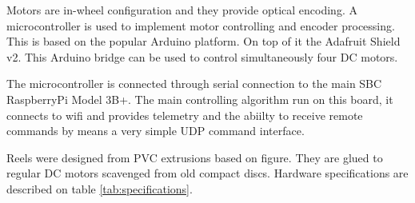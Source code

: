 \documentclass[journal]{IEEEtran}
\begin{document}
Motors are in-wheel configuration and they provide optical encoding.  A microcontroller is used to implement motor controlling and encoder processing.  This is based on the popular Arduino platform.  On top of it the Adafruit Shield v2.  This Arduino bridge can be used to control simultaneously four DC motors.

The microcontroller is connected through serial connection to the main SBC RaspberryPi Model 3B+.  The main controlling algorithm run on this board, it connects to wifi and provides telemetry and the abiilty to receive remote commands by means a very simple UDP command interface.

Reels were designed from PVC extrusions based on figure.  They are glued to regular DC motors scavenged from old compact discs.  Hardware specifications are described on table \ref{tab:specifications}.
\end{document}
